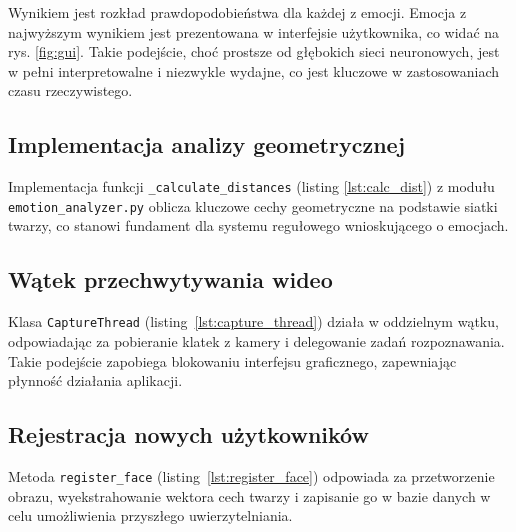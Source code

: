 

Wynikiem jest rozkład prawdopodobieństwa dla każdej z emocji. Emocja z najwyższym wynikiem jest prezentowana w interfejsie użytkownika, co widać na rys. \ref{fig:gui}. Takie podejście, choć prostsze od głębokich sieci neuronowych, jest w pełni interpretowalne i niezwykle wydajne, co jest kluczowe w zastosowaniach czasu rzeczywistego.

\subsection{Implementacja analizy geometrycznej}
Implementacja funkcji \texttt{\_calculate\_distances} (listing \ref{lst:calc_dist}) z modułu \texttt{emotion\_analyzer.py} oblicza kluczowe cechy geometryczne na podstawie siatki twarzy, co stanowi fundament dla systemu regułowego wnioskującego o emocjach.



\subsection{Wątek przechwytywania wideo}
Klasa \texttt{CaptureThread} (listing~\ref{lst:capture_thread}) działa w oddzielnym wątku, odpowiadając za pobieranie klatek z kamery i delegowanie zadań rozpoznawania. Takie podejście zapobiega blokowaniu interfejsu graficznego, zapewniając płynność działania aplikacji.



\subsection{Rejestracja nowych użytkowników}
Metoda \texttt{register\_face} (listing~\ref{lst:register_face}) odpowiada za przetworzenie obrazu, wyekstrahowanie wektora cech twarzy i zapisanie go w bazie danych w celu umożliwienia przyszłego uwierzytelniania.







